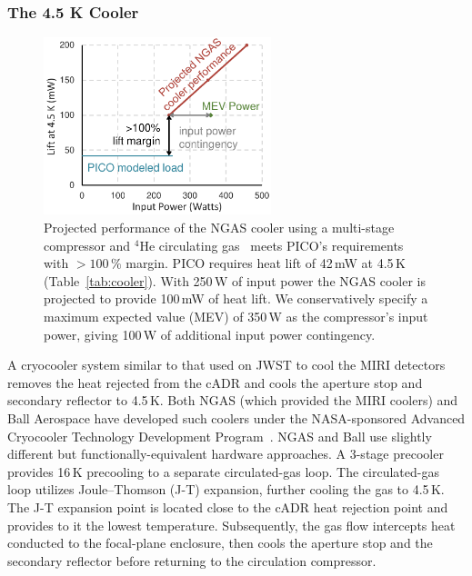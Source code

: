 \subsubsection{The 4.5 K Cooler}
\label{sec:4kcooler} %

\begin{figure}
\vspace{-8pt}
\includegraphics[width=2.6in]{figures/CoolerFigure.pdf} 
\caption{\captiontext
Projected performance of the NGAS cooler using a multi-stage
compressor and $^4$He circulating gas~\citep{Rabb2013} meets PICO's requirements
with $>100\,\%$ margin. PICO requires heat lift of 42\,mW at 4.5\,K (Table~\ref{tab:cooler}). With 250\,W of input power the NGAS cooler is projected to provide 100\,mW of heat lift. We conservatively specify a maximum expected value (MEV) of 350\,W as the compressor's input power, giving 100\,W of additional input power contingency.
\label{fig:CoolerFigure}} 
\end{figure}
%
A cryocooler system similar to that used on JWST to cool the MIRI detectors~\citep{Durand2008,Rabb2013} removes the heat rejected from the cADR and cools the aperture stop and secondary reflector to 4.5\,K. Both NGAS (which provided the MIRI coolers) and Ball Aerospace have developed such coolers under the NASA-sponsored Advanced Cryocooler Technology Development Program~\citep{Glaister2006}. NGAS and Ball use slightly different but functionally-equivalent hardware approaches. A 3-stage precooler provides 16\,K precooling to a separate circulated-gas loop. The circulated-gas loop utilizes Joule--Thomson (J-T) expansion, further cooling the gas to 4.5\,K. The J-T expansion point is located close to the cADR heat rejection point and provides to it the lowest temperature. Subsequently, the gas flow intercepts heat conducted to the focal-plane enclosure, then cools the aperture stop and the secondary reflector before returning to the circulation compressor.  %

